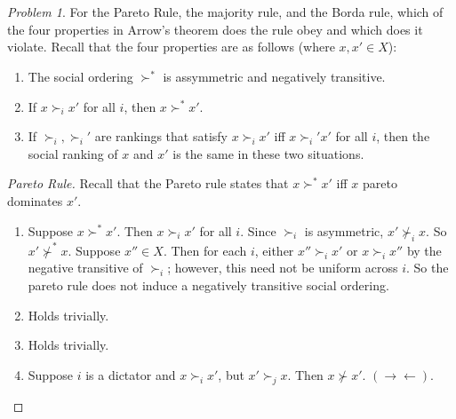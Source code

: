 \documentclass[12pt]{article}
\theoremstyle{definition}
\theoremstyle{remark}
\newtheorem{prob}{Problem}[section]
\def\contra{\rightarrow \leftarrow}
\begin{document}
\section{}
\begin{prob}
  For the Pareto Rule, the majority rule, and the Borda rule, which of the four properties in Arrow's theorem does the rule obey and which does it violate. Recall that the four properties are as follows (where $x, x' \in X$):
  \begin{enumerate}
    \item The social ordering $\succ^*$ is assymmetric and negatively transitive.
    \item If $x \succ_i x'$ for all $i$, then $x \succ^* x'$.
    \item If $\succ_i, \succ_i'$ are rankings that satisfy $x \succ_i x'$ iff $x \succ_i' x'$ for all $i$, then the social ranking of $x$ and $x'$ is the same in these two situations.
  \end{enumerate}
\end{prob}
\begin{proof}[Pareto Rule]
  Recall that the Pareto rule states that $x \succ^* x'$ iff $x$ pareto dominates $x'$.
  \begin{enumerate}
    \item Suppose $x \succ^* x'$. Then $x \succ_i x'$ for all $i$. Since $\succ_i$ is asymmetric, $x' \not\succ_i x$. So $x' \not\succ^* x$. Suppose $x'' \in X$. Then for each $i$, either $x'' \succ_i x'$ or $x \succ_i x''$ by the negative transitive of $\succ_i$; however, this need not be uniform across $i$. So the pareto rule does not induce a negatively transitive social ordering.
    \item Holds trivially.
    \item Holds trivially.
    \item Suppose $i$ is a dictator and $x \succ_i x'$, but $x' \succ_j x$. Then $x \not\succ x'$. $(\contra)$.
  \end{enumerate}
\end{proof}
\end{document}
